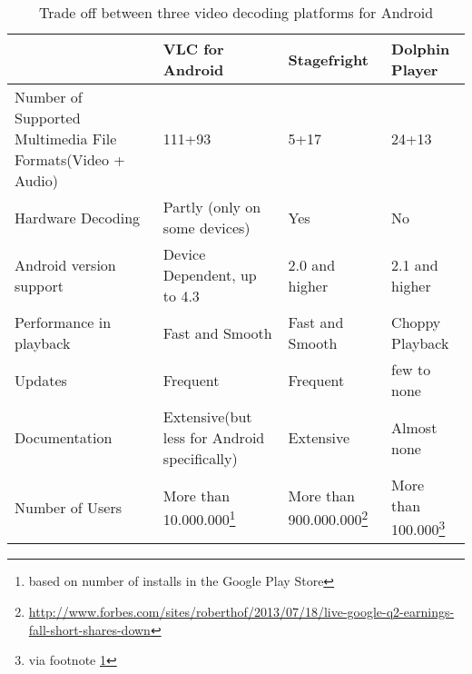 \begin{savenotes}
\begin{table}[h]
\caption{Trade off between three video decoding platforms for Android \label{tab:vid_dec_table}}
	\begin{tabularx}{\textwidth}{|X|X|X|X|}
	\hline
	& VLC for Android & Stagefright & Dolphin Player \\ \hline
	Number of Supported Multimedia File Formats(Video + Audio)
	& 111+93
	& 5+17
	& 24+13 \\ \hline
	Hardware Decoding 
	& Partly (only on some devices)
	& Yes
	& No \\ \hline
	Android version support
	& Device Dependent, up to 4.3
	& 2.0 and higher
	& 2.1 and higher \\ \hline
	Performance in playback
	& Fast and Smooth
	& Fast and Smooth
	& Choppy Playback \\ \hline
	Updates
	& Frequent
	& Frequent
	& few to none \\ \hline
	Documentation
	& Extensive(but less for Android specifically)
	& Extensive
	& Almost none \\ \hline
	Number of Users
	& More than 10.000.000\footnote{\label{install}based on number of installs in the Google Play Store}
	& More than 900.000.000\footnote{\url{http://www.forbes.com/sites/roberthof/2013/07/18/live-google-q2-earnings-fall-short-shares-down}}
	& More than 100.000\footnote{via footnote \ref{install}} \\ \hline
	\end{tabularx}
\end{table}
\end{savenotes}



